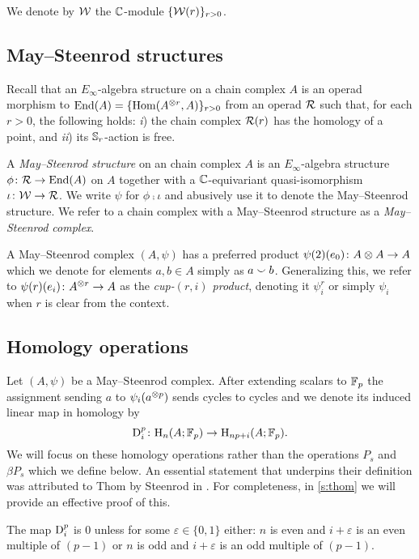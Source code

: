 We denote by $\mathcal{W}$ the $\mathbb{C}$-module $\{\mathcal{W}(r)\}_{r > 0}$.

\subsection{May--Steenrod structures}

Recall that an $E_\infty$-algebra structure on a chain complex $A$ is an operad morphism to $\mathrm{End}(A) = \{\mathrm{Hom}(A^{\otimes r}, A)\}_{r>0}$ from an operad $\mathcal{R}$ such that, for each $r > 0$, the following holds: \textit{i}) the chain complex $\mathcal{R}(r)$ has the homology of a point, and \textit{ii}) its $\mathbb{S}_r$-action is free.

A \textit{May--Steenrod structure} on an chain complex $A$ is an $E_\infty$-algebra structure $\phi \colon \mathcal{R} \to \mathrm{End}(A)$ on $A$ together with a $\mathbb{C}$-equivariant quasi-isomorphism $\iota \colon \mathcal{W} \to \mathcal{R}$.
We write $\psi$ for $\phi \comp \iota$ and abusively use it to denote the May--Steenrod structure.
We refer to a chain complex with a May--Steenrod structure as a \textit{May--Steenrod complex}.

A May--Steenrod complex $(A,\psi)$ has a preferred product $\psi(2)(e_0) \colon A \otimes A \to A$ which we denote for elements $a, b \in A$ simply as $a \smallsmile b$.
Generalizing this, we refer to $\psi(r)(e_i) \colon A^{\otimes r} \to A$ as the \textit{cup-$(r,i)$ product}, denoting it $\psi_i^r$ or simply $\psi_i$ when $r$ is clear from the context.

\subsection{Homology operations}\label{ss:homology_operations}

Let $(A,\psi)$ be a May--Steenrod complex.
After extending scalars to ${\mathbb{F}_p}$ the assignment sending $a$ to $\psi_i(a^{\otimes p})$ sends cycles to cycles and we denote its induced linear map in homology by
\[
\mathrm{D}_i^p \colon \mathrm{H}_n(A; {\mathbb{F}_p}) \to \mathrm{H}_{np+i}(A; {\mathbb{F}_p}).
\]
We will focus on these homology operations rather than the operations $P_s$ and $\beta P_s$ which we define below.
An essential statement that underpins their definition was attributed to Thom by Steenrod in \cite[Theorem~4.8]{steenrod1947products}.
For completeness, in \cref{s:thom} we will provide an effective proof of this.

\begin{theorem}[Thom]\label{t:thom}
	The map $\mathrm{D}_i^p$ is $0$ unless for some $\varepsilon \in \{0,1\}$ either: $n$ is even and $i+\varepsilon$ is an even multiple of $(p-1)$ or $n$ is odd and $i+\varepsilon$ is an odd multiple of $(p-1)$.
\end{theorem}

